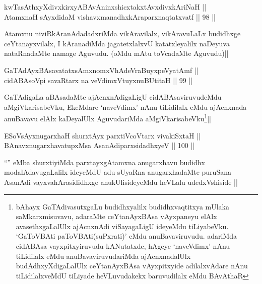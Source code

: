 
\begin{shl}
kwTasAthxyXdivxkirxyABAvAninxshicxtakxtAvxdivxkAriNaH || \\
AtamxnaH sAyxdidaM vishavxmanadhxkAraparxnaqtatxvatf ||  98 ||  
\end{shl}

\begin{artha}
Atamxnu niviRkAranAdadadxriMda vikAravilalx, vikAravuLaLx budidhxge ceYtanayxvilalx, I kAranadiMda jagatetxlalxvU katatxleyalilx naDeyuva nataRnadaMte namage Aguvudu. (oMdu mAtu toVcadaMte Aguvudu)||
\end{artha}


\begin{shl}
GaTAdAyxBAsavatatxsAmxnomxVhAdeVraBuyxpeVyatAmf || \\
cidABAsoV\s pi savaRtarx na veVdimxVtuyxnuBUtitaH ||  99 ||  
\end{shl}

\begin{artha}
GaTAdigaLa aBAsadaMte ajAcnxnAdigaLigU cidABAsaviruvudeMdu aMgiVkarisabeVku, EkeMdare `naveVdimx' nAnu tiLidilalx eMdu ajAcnxnada anuBavavu elAlx kaDeyalUlx AguvudariMda aMgiVkarisabeVku\footnote{bAhayx GaTAdivasutxgaLu budidhxyalilx budidhxvaqtitxya mUlaka saMkarxmisuvavu, adaraMte ceYtanAyxBAsa vAyxpaneyu elAlx avasethxgaLalUlx ajAcnxnAdi viSayagaLigU ideyeMdu tiLiyabeVku. `GaToVBAti paToVBAti(suPxrati)' eMdu anuBavaviruvudu. adariMda cidABAsa vayxpitxyiruvudu kANutatxde, hAgeye `naveVdimx' nAnu tiLidilalx eMdu anuBavaviruvudariMda ajAcnxnadalUlx budAdhxyXdigaLalUlx ceYtanAyxBAsa vAyxpitxyide adilalxvAdare nAnu tiLidilalxveMdU tiLiyade heVLuvudakekx baruvudilalx eMdu BAvAthaR}||
\end{artha}

\begin{shl}
ESoV\s sAyxnugarxhaH shurxtAyx parxtiVcoV\s tarx vivakiSxtaH || \\
BAnavxnugarxhavatupxMsa AsanAdiparxsidadhxyeV ||  100 ||  
\end{shl}

\begin{artha}
``\stext'' eMba shurxtiyiMda parxtayxgAtamxna anugarxhavu budidhx modalAdavugaLalilx ideyeMdU adu sUyaRna anugarxhadaMte puruSana AsanAdi vayxvahArasididhxge anukUlisideyeMdu heVLalu udedxVshiside ||
\end{artha}

